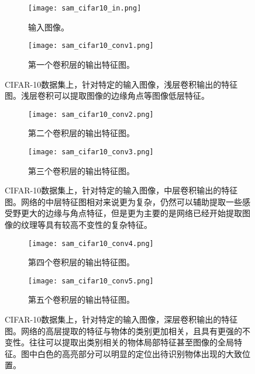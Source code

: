 \begin{figure}[h]
  \centering%
  \begin{subfigure}{0.13\textwidth}
    \texttt{[image: sam\_cifar10\_in.png]}
    \caption{输入图像。}
  \end{subfigure}%
  \hspace{1em}%
  \begin{subfigure}{0.8\textwidth}
    \texttt{[image: sam\_cifar10\_conv1.png]}
    \caption{第一个卷积层的输出特征图。}
  \end{subfigure}
  \caption{CIFAR-10数据集上，针对特定的输入图像，浅层卷积输出的特征图。浅层卷积可以提取图像的边缘角点等图像低层特征。}
  \label{fig:sam_cifar10_conv1}
\end{figure}


\begin{figure}[h]
  \centering%
  \begin{subfigure}{0.45\textwidth}
    \texttt{[image: sam\_cifar10\_conv2.png]}
    \caption{第二个卷积层的输出特征图。}
  \end{subfigure}%
  \hspace{1em}%
  \begin{subfigure}{0.45\textwidth}
    \texttt{[image: sam\_cifar10\_conv3.png]}
    \caption{第三个卷积层的输出特征图。}
  \end{subfigure}
  \caption{CIFAR-10数据集上，针对特定的输入图像，中层卷积输出的特征图。网络的中层特征图相对来说更为复杂，仍然可以辅助提取一些感受野更大的边缘与角点特征，但是更为主要的是网络已经开始提取图像的纹理等具有较高不变性的复杂特征。}
  \label{fig:sam_cifar10_conv3}
\end{figure}

\begin{figure}[h]
  \centering%
  \begin{subfigure}{0.45\textwidth}
    \texttt{[image: sam\_cifar10\_conv4.png]}
    \caption{第四个卷积层的输出特征图。}
  \end{subfigure}%
  \hspace{1em}%
  \begin{subfigure}{0.45\textwidth}
    \texttt{[image: sam\_cifar10\_conv5.png]}
    \caption{第五个卷积层的输出特征图。}
  \end{subfigure}
  \caption{CIFAR-10数据集上，针对特定的输入图像，深层卷积输出的特征图。网络的高层提取的特征与物体的类别更加相关，且具有更强的不变性。往往可以提取出类别相关的物体局部特征甚至图像的全局特征。图中白色的高亮部分可以明显的定位出待识别物体出现的大致位置。}
  \label{fig:sam_cifar10_conv5}
\end{figure}

